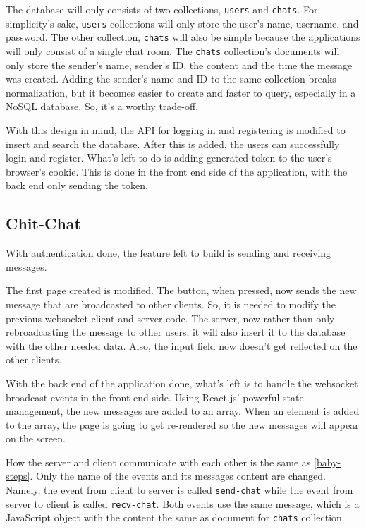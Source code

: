 \documentclass[conference]{IEEEtran}
\begin{document}
The database will only consists of two collections, \texttt{users} and \texttt{chats}.
For simplicity's sake, \texttt{users} collections will only store the user's name,
username, and password. The other collection, \texttt{chats} will also be simple
because the applications will only consist of a single chat room. The \texttt{chats}
collection's documents will only store the sender's name, sender's ID, the content and
the time the message was created. Adding the sender's name and ID to the same collection
breaks normalization, but it becomes easier to create and faster to query, especially
in a NoSQL database. So, it's a worthy trade-off.

With this design in mind, the API for logging in and registering is modified to
insert and search the database. After this is added, the users can successfully login
and register. What's left to do is adding generated token to the user's browser's
cookie. This is done in the front end side of the application, with the back end only
sending the token.

\subsection{Chit-Chat}

With authentication done, the feature left to build is sending and receiving messages.

The first page created is modified. The button, when pressed, now sends the new
message that are broadcasted to other clients. So, it is needed to modify the previous
websocket client and server code. The server, now rather than only rebroadcasting the
message to other users, it will also insert it to the database with the other needed
data. Also, the input field now doesn't get reflected on the other clients.

With the back end of the application done, what's left is to handle the websocket
broadcast events in the front end side. Using React.js' powerful state management,
the new messages are added to an array. When an element is added to the array, the
page is going to get re-rendered so the new messages will appear on the screen.

How the server and client communicate with each other is the same as \ref{baby-steps}.
Only the name of the events and its messages content are changed. Namely, the event
from client to server is called \texttt{send-chat} while the event from server to
client is called \texttt{recv-chat}. Both events use the same message, which is a
JavaScript object with the content the same as document for \texttt{chats} collection.
\end{document}
